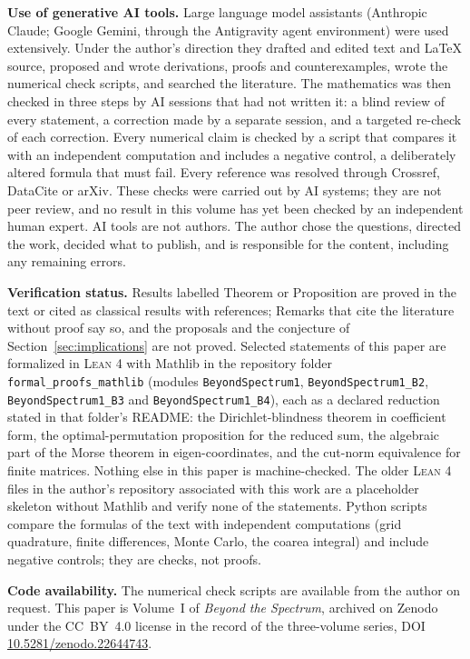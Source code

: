 \documentclass[11pt,a4paper,reqno]{amsart}
\theoremstyle{definition}
\numberwithin{equation}{section}
\begin{document}
\medskip\noindent\textbf{Use of generative AI tools.} Large language model
assistants (Anthropic Claude; Google Gemini, through the Antigravity agent
environment) were used extensively. Under the author's direction they drafted and
edited text and \LaTeX{} source, proposed and wrote derivations, proofs and
counterexamples, wrote the numerical check scripts, and searched the literature.
The mathematics was then checked in three steps by AI sessions that had not
written it: a blind review of every statement, a correction made by a separate
session, and a targeted re-check of each correction. Every numerical claim is
checked by a script that compares it with an independent computation and includes
a negative control, a deliberately altered formula that must fail. Every reference
was resolved through Crossref, DataCite or arXiv. These checks were carried out by
AI systems; they are not peer review, and no result in this volume has yet been
checked by an independent human expert. AI tools are not authors. The author
chose the questions, directed the work, decided what to publish, and is
responsible for the content, including any remaining errors.

\medskip\noindent\textbf{Verification status.} Results labelled Theorem or Proposition are proved in the text or cited as classical results with references; Remarks that cite the literature without proof say so, and the proposals and the conjecture of Section~\ref{sec:implications} are not proved. Selected statements of this paper are formalized in \textsc{Lean 4} with Mathlib in the repository folder \texttt{formal\_proofs\_mathlib} (modules \texttt{BeyondSpectrum1}, \texttt{BeyondSpectrum1\_B2}, \texttt{BeyondSpectrum1\_B3} and \texttt{BeyondSpectrum1\_B4}), each as a declared reduction stated in that folder's README: the Dirichlet-blindness theorem in coefficient form, the optimal-permutation proposition for the reduced sum, the algebraic part of the Morse theorem in eigen-coordinates, and the cut-norm equivalence for finite matrices. Nothing else in this paper is machine-checked. The older \textsc{Lean 4} files in the author's repository associated with this work are a placeholder skeleton without Mathlib and verify none of the statements. Python scripts compare the formulas of the text with independent computations (grid quadrature, finite differences, Monte Carlo, the coarea integral) and include negative controls; they are checks, not proofs.

\medskip\noindent\textbf{Code availability.} The numerical check scripts are
available from the author on request.
This paper is Volume~I of \emph{Beyond the Spectrum}, archived on Zenodo under the CC~BY~4.0 license in the record of the three-volume series, DOI \href{https://doi.org/10.5281/zenodo.22644743}{10.5281/zenodo.22644743}.
\end{document}
